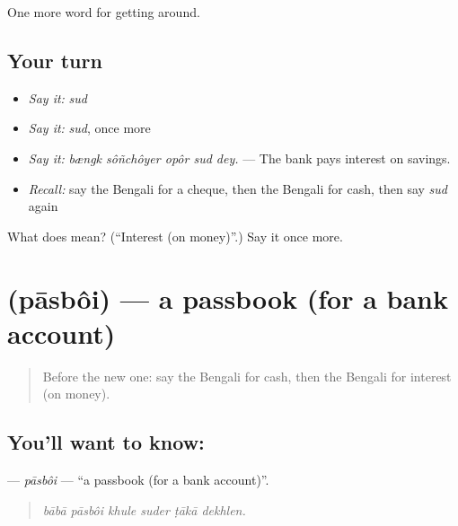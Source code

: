 \begin{grammarlens}[title={What you've built}]
One more word for getting around.
\end{grammarlens}

\subsection*{Your turn}
\begin{itemize}
\raggedright
  \item \emph{Say it:} \emph{sud}
  \item \emph{Say it:} \emph{sud}, once more
  \item \emph{Say it:} \emph{bængk sôñchôyer opôr sud dey.} — The bank pays interest on savings.
  \item \emph{Recall:} say the Bengali for a cheque, then the Bengali for cash, then say \emph{sud} again
\end{itemize}

\begin{tcolorbox}[breakable,colback=teal!4,colframe=teal!35!black,title={Before you move on}]
What does  mean? (\textquotedblleft{}Interest (on money)\textquotedblright{}.) Say it once more.
\end{tcolorbox}
\section[\texorpdfstring{\bn{পাসবই} (pāsbôi)}{পাসবই (pāsbôi)}]{ (pāsbôi) — a passbook (for a bank account)}

\label{lesson:BN-C415-pasboi}



\begin{quote}
Before the new one: say the Bengali for cash, then the Bengali for interest (on money).
\end{quote}

\subsection*{You'll want to know: }
\textbf{} — \emph{pāsbôi} — \textquotedblleft{}a passbook (for a bank account)\textquotedblright{}.

\begin{quote}
     
\end{quote}

\begin{quote}
\emph{bābā pāsbôi khule suder ṭākā dekhlen.}
\end{quote}

